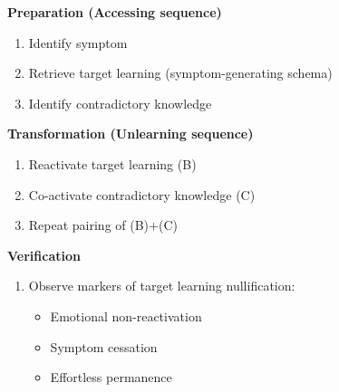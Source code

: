 \documentclass[12pt,letterpaper]{book}
\begin{document}
\noindent\textbf{Preparation (Accessing sequence)}
\begin{enumerate}
\renewcommand{\labelenumi}{\Alph{enumi}.}
    \item Identify symptom
    \item Retrieve target learning (symptom-generating schema)
    \item Identify contradictory knowledge
\end{enumerate}

\noindent\textbf{Transformation (Unlearning sequence)}
\begin{enumerate}
    \item Reactivate target learning (B)
    \item Co-activate contradictory knowledge (C)
    \item Repeat pairing of (B)+(C)
\end{enumerate}

\noindent\textbf{Verification}
\begin{enumerate}
    \renewcommand{\labelenumi}{V.}
    \item Observe markers of target learning nullification:
    \begin{itemize}
        \item Emotional non-reactivation
        \item Symptom cessation
        \item Effortless permanence
    \end{itemize}
\end{enumerate}
\end{document}
